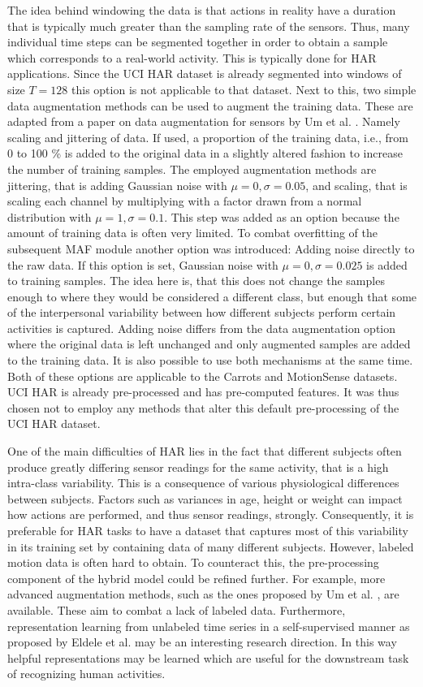 \documentclass[11pt,titlepage,oneside,openany]{book}
\begin{document}
The idea behind windowing the data is that actions in reality have a duration that is typically much greater than the sampling rate of the sensors. Thus, many individual time steps can be segmented together in order to obtain a sample which corresponds to a real-world activity. This is typically done for HAR applications. Since the UCI HAR dataset is already segmented into windows of size $T=128$ this option is not applicable to that dataset. Next to this, two simple data augmentation methods can be used to augment the training data. These are adapted from a paper on data augmentation for sensors by Um et al. \cite{um_data_2017}. Namely scaling and jittering of data. If used, a proportion of the training data, i.e., from 0 to 100 \% is added to the original data in a slightly altered fashion to increase the number of training samples. The employed augmentation methods are jittering, that is adding Gaussian noise with $\mu = 0, \sigma = 0.05$, and scaling, that is scaling each channel by multiplying with a factor drawn from a normal distribution with $\mu = 1, \sigma = 0.1$. This step was added as an option because the amount of training data is often very limited. To combat overfitting of the subsequent MAF module another option was introduced: Adding noise directly to the raw data. If this option is set, Gaussian noise with $\mu = 0, \sigma = 0.025$ is added to training samples. The idea here is, that this does not change the samples enough to where they would be considered a different class, but enough that some of the interpersonal variability between how different subjects perform certain activities is captured. Adding noise differs from the data augmentation option where the original data is left unchanged and only augmented samples are added to the training data. It is also possible to use both mechanisms at the same time. Both of these options are applicable to the Carrots and MotionSense datasets. UCI HAR is already pre-processed and has pre-computed features. It was thus chosen not to employ any methods that alter this default pre-processing of the UCI HAR dataset.

One of the main difficulties of HAR lies in the fact that different subjects often produce greatly differing sensor readings for the same activity, that is a high intra-class variability. This is a consequence of various physiological differences between subjects. Factors such as variances in age, height or weight can impact how actions are performed, and thus sensor readings, strongly. Consequently, it is preferable for HAR tasks to have a dataset that captures most of this variability in its training set by containing data of many different subjects. However, labeled motion data is often hard to obtain. To counteract this, the pre-processing component of the hybrid model could be refined further. For example, more advanced augmentation methods, such as the ones proposed by Um et al. \cite{um_data_2017}, are available. These aim to combat a lack of labeled data. Furthermore, representation learning from unlabeled time series in a self-supervised manner as proposed by Eldele et al. \cite{eldele_time-series_2021} may be an interesting research direction. In this way helpful representations may be learned which are useful for the downstream task of recognizing human activities.
\end{document}
